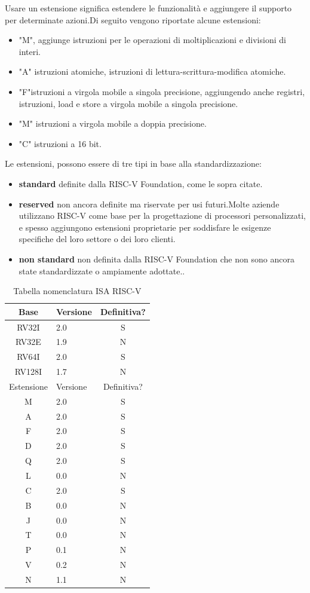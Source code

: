 \documentclass[12pt, a4paper]{report}
\begin{document}
Usare un estensione significa estendere le funzionalità e aggiungere il supporto per determinate azioni.Di seguito vengono riportate alcune estensioni:
\begin{itemize}
		\item "M", aggiunge istruzioni per le operazioni di moltiplicazioni e divisioni di interi.
		\item "A" istruzioni atomiche, istruzioni di lettura-scrittura-modifica atomiche. %
		\item "F"istruzioni a virgola mobile a singola precisione, aggiungendo anche registri, istruzioni, load e store a virgola mobile a singola precisione.
		\item "M" istruzioni a virgola mobile a doppia precisione.
		\item "C" istruzioni a 16 bit.
\end{itemize}

Le estensioni, possono essere di tre tipi in base alla standardizzazione:
\begin{itemize}
	\item \textbf{standard} definite dalla RISC-V Foundation, come le sopra citate.
	\item \textbf{reserved} non ancora definite ma riservate per usi futuri.Molte aziende utilizzano RISC-V come base per la progettazione di processori personalizzati, e spesso aggiungono estensioni proprietarie per soddisfare le esigenze specifiche del loro settore o dei loro clienti.
	\item \textbf{non standard} non definita dalla RISC-V Foundation che non sono ancora state standardizzate o ampiamente adottate..
\end{itemize}

\begin{table}
\centering
\begin{tabular}{|c|l|c|}
\hline
Base & Versione & Definitiva? \\
\hline
RV32I & 2.0 & S\\
RV32E & 1.9 & N\\
RV64I & 2.0 & S\\
RV128I & 1.7 & N\\
\hline
Estensione & Versione & Definitiva? \\
\hline
M & 2.0 & S\\
A & 2.0 & S\\
F & 2.0 & S\\
D & 2.0 & S\\
Q & 2.0 & S\\
L & 0.0 & N\\
C & 2.0 & S\\
B & 0.0 & N\\
J & 0.0 & N\\
T & 0.0 & N \\
P & 0.1 & N\\
V & 0.2 & N\\
N & 1.1 & N\\
\hline

\end{tabular}
	\caption{Tabella nomenclatura ISA RISC-V}
	\label{tab:nomenclaturaISA}
\end{table}
\end{document}

